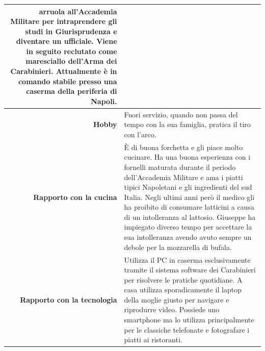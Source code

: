 \begin{table}[H]
\begin{centering}
\begin{tabular} { | r  p{10cm} | }
arruola all'Accademia Militare per intraprendere gli studi in
Giurisprudenza e diventare un ufficiale. Viene in seguito reclutato come
maresciallo dell'Arma dei Carabinieri. Attualmente è in comando stabile
presso una caserma della periferia di Napoli. \\\hline
		\textbf{Hobby} & Fuori servizio, quando non passa del tempo con
la sua famiglia, pratica il tiro con l'arco.\\ \hline
		\textbf{Rapporto con la cucina} & È di buona forchetta e gli
piace molto cucinare. Ha una buona esperienza con i fornelli maturata
durante il periodo dell'Accademia Militare e ama i piatti tipici
Napoletani e gli ingredienti del sud Italia. Negli ultimi anni però il
medico gli ha proibito di consumare latticini a causa di un intolleranza al
lattosio. Giuseppe ha impiegato diverso tempo per accettare la sua
intolleranza avendo avuto sempre un debole per la mozzarella di bufala.\\ \hline
		\textbf{Rapporto con la tecnologia} & Utilizza il PC in caserma
esclusivamente tramite il sistema software dei Carabinieri per risolvere
le pratiche quotidiane. A casa utilizza sporadicamente il
laptop della moglie giusto per navigare e riprodurre video. Possiede uno
smartphone ma lo utilizza principalmente per le classiche telefonate e fotografare i
piatti ai ristoranti.\\ \hline
	\end{tabular}
	\end{centering}
\end{table}
